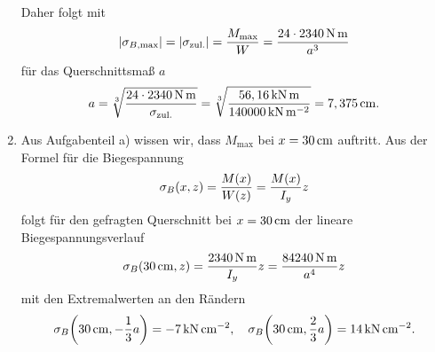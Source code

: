 \documentclass{exercise}
\begin{document}
\begin{enumerate}
        Daher folgt mit
        \[
            \absolute*{\sigma_{B, \text{max}}} = \absolute*{\sigma_{\text{zul.}}} = \frac{M_{\text{max}}}{W} = \frac{24 \cdot 2340\sis{\newton\meter}}{a^3}
        \]
        für das Querschnittsmaß \(a\)
        \[
            a = \sqrt[3]{\frac{24 \cdot 2340\sis{\newton\meter}}{\sigma_{\text{zul.}}}} = \sqrt[3]{\frac{56,16\sis{\kilo\newton\meter}}{140000\sis{\kilo\newton\per\meter\squared}}} = 7,375\sis{\centi\meter}.
        \]
        \item Aus Aufgabenteil a) wissen wir, dass \(M_{\text{max}}\) bei \(x = 30\sis{\centi\meter}\) auftritt.
        Aus der Formel für die Biegespannung
        \[
            \sigma_B\parentheses*{x, z} = \frac{M\parentheses*{x}}{W\parentheses*{z}} = \frac{M\parentheses*{x}}{I_y}z
        \]
        folgt für den gefragten Querschnitt bei \(x = 30\sis{\centi\meter}\) der lineare Biegespannungsverlauf
        \[
            \sigma_B\parentheses*{30\sis{\centi\meter}, z} = \frac{2340\sis{\newton\meter}}{I_y}z = \frac{84240\sis{\newton\meter}}{a^4}z
        \]
        mit den Extremalwerten an den Rändern
        \[
            \sigma_B\parentheses*{30\sis{\centi\meter}, -\frac{1}{3}a} = -7\sis{\kilo\newton\per\centi\meter\squared}, \quad \sigma_B\parentheses*{30\sis{\centi\meter}, \frac{2}{3}a} = 14\sis{\kilo\newton\per\centi\meter\squared}.
        \]
    \end{enumerate}
\end{document}
